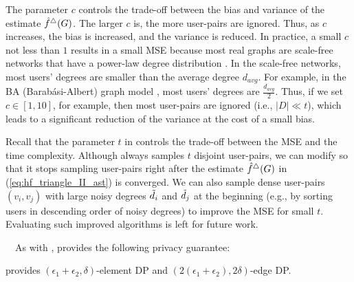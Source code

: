 The parameter $c$ controls the trade-off between the bias and variance of the estimate $\hat{f}^\triangle(G)$.
The larger $c$ is, the more user-pairs are ignored.
Thus, as $c$ increases, the bias is increased, and the variance is reduced.
In practice,
a small $c$ not less than $1$ 
results in a small MSE %
because most real graphs are scale-free networks that have a power-law degree distribution \cite{NetworkScience}.
In the scale-free networks, most users' degrees are smaller than the average degree $d_{avg}$.
For example, in the BA (Barab\'{a}si-Albert) graph model \cite{NetworkScience,Hagberg_SciPy08},
most users' degrees are $\frac{d_{avg}}{2}$.
Thus, if we set
$c \in [1,10]$, for example,
then most user-pairs are ignored (i.e., $|D| \ll t$), which leads to a significant reduction of the variance at the cost of a small bias.

Recall that the parameter $t$ in \AlgWSTriVR{} controls the trade-off between the MSE and the time complexity. 
Although \AlgWSTriVR{} always samples $t$ disjoint user-pairs, we can modify \AlgWSTriVR{} so that it stops sampling user-pairs right after the estimate $\hat{f}^\triangle(G)$ in (\ref{eq:hf_triangle_II_ast}) is converged. 
We can also sample dense user-pairs $(v_i, v_j)$ with large noisy degrees $\tilde{d}_i$ and $\tilde{d}_j$ at the beginning (e.g., by sorting users in descending order of noisy degrees) to improve the MSE for small $t$. 
Evaluating such improved algorithms is left for future work. 

\smallskip
{}~~As with \AlgWSTri{},
\AlgWSTriVR{} provides the following privacy guarantee:

\begin{theorem}
\label{thm:DP_II_ast}
\AlgWSTriVR{} provides $(\epsilon_1 + \epsilon_2, \delta)$-element DP and $(2(\epsilon_1 + \epsilon_2), 2\delta)$-edge DP.
\end{theorem}

